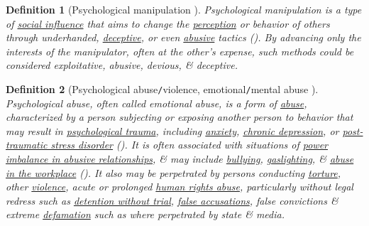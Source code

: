 \documentclass[12pt]{article}
\newtheorem{definition}{Definition}[section]
\begin{document}
\begin{definition}[Psychological manipulation \cite{Psychological Wiki/Psychological manipulation,Wikipedia/Pyschological manipulation}]
	\emph{Psychological manipulation} is a type of \href{https://psychology.wikia.org/wiki/Social_influence}{social influence} that aims to change the \href{https://en.wikipedia.org/wiki/Perception}{perception} or behavior of others through underhanded, \href{https://en.wikipedia.org/wiki/Deceptive}{deceptive}, or even \href{https://psychology.wikia.org/wiki/Abuse}{abusive} tactics (\cite{Braiker2004}). By advancing only the interests of the manipulator, often at the other's expense, such methods could be considered exploitative, abusive, devious, \& deceptive.
\end{definition}

\begin{definition}[Psychological abuse{\tt/}violence, emotional{\tt/}mental abuse \cite{Psychology Wiki/Abusive relationship,Wikipedia/Psychological abuse}]
	\emph{Psychological abuse}, often called \emph{emotional abuse}, is a form of \href{https://en.wikipedia.org/wiki/Abuse}{abuse}, characterized by a person subjecting or exposing another person to behavior that may result in \href{https://en.wikipedia.org/wiki/Psychological_trauma}{psychological trauma}, including \href{https://en.wikipedia.org/wiki/Anxiety_disorder}{anxiety}, \href{https://en.wikipedia.org/wiki/Chronic_depression}{chronic depression}, or \href{https://en.wikipedia.org/wiki/Post-traumatic_stress_disorder}{post-traumatic stress disorder} (\cite{Dutton1994,Dutton_Goodman_Bennett2000,Thompson_Kaplan1996}). It is often associated with situations of \href{https://en.wikipedia.org/wiki/Abusive_power_and_control}{power imbalance in abusive relationships}, \& may include \href{https://en.wikipedia.org/wiki/Bullying}{bullying}, \href{https://en.wikipedia.org/wiki/Gaslighting}{gaslighting}, \& \href{https://en.wikipedia.org/wiki/Workplace_bullying}{abuse in the workplace} (\cite{Dutton_Goodman_Bennett2000,Thompson_Kaplan1996}). It also may be perpetrated by persons conducting \href{https://en.wikipedia.org/wiki/Torture}{torture}, other \href{https://en.wikipedia.org/wiki/Violence}{violence}, acute or prolonged \href{https://en.wikipedia.org/wiki/Human_rights_abuse}{human rights abuse}, particularly without legal redress such as \href{https://en.wikipedia.org/wiki/Detention_without_trial}{detention without trial}, \href{https://en.wikipedia.org/wiki/False_accusation}{false accusations}, false convictions \& extreme \href{https://en.wikipedia.org/wiki/Defamation}{defamation} such as where perpetrated by state \& media. 
\end{definition}
\end{document}
